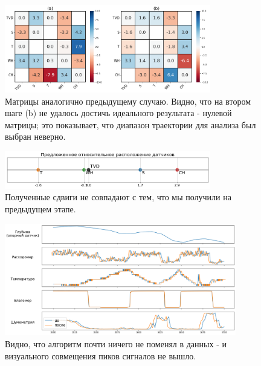 \begin{figure}[H]
\centering
\includegraphics[width=0.8\textwidth]{DM/shift_matrices_bad.png}
\caption{Матрицы аналогично предыдущему случаю. Видно, что на втором шаге (b)  не удалось достичь идеального результата - нулевой матрицы; это показывает, что диапазон траектории для анализа был выбран неверно.}
\label{fig:shift_matrices_bad}
\end{figure}

\begin{figure}[H]
\centering
\includegraphics[width=0.8\textwidth]{DM/shift_log_bad.png}
\caption{Полученные сдвиги не совпадают с тем, что мы получили на предыдущем этапе.}
\label{fig:shift_log_bad}
\end{figure}

\begin{figure}[H]
\centering
\includegraphics[width=0.9\textwidth]{DM/shift_signals_bad.png}
\caption{Видно, что алгоритм почти ничего не поменял в данных - и визуального совмещения пиков сигналов не вышло.}
\label{fig:shift_signals_bad}
\end{figure}
